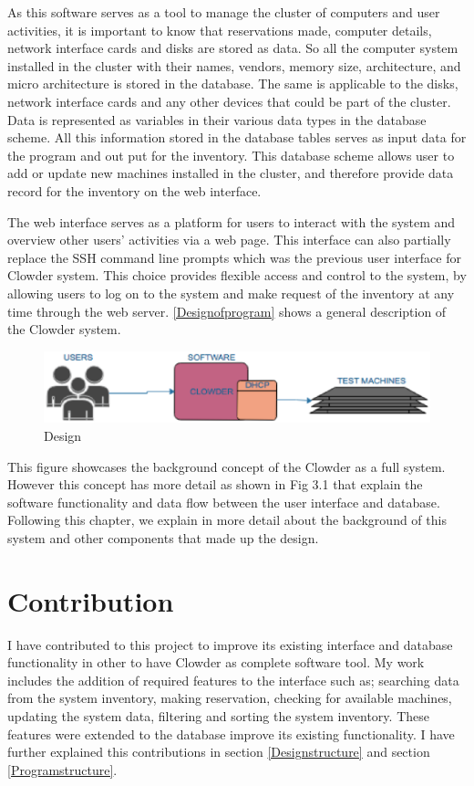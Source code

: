 As this software serves as a tool to manage the cluster of computers and user activities, it is important to know that  reservations made, computer details, network interface cards and disks are stored as data. So all the computer system installed in the cluster with their names, vendors, memory size, architecture, and micro architecture is stored in the database. The same is applicable to the disks, network interface cards and any other devices that could be part of the cluster. Data is represented as variables in their various data types in the database scheme.  All this information stored in the database tables serves as input  data for the program and out put for the inventory. This database scheme allows user to add or update new machines installed in the cluster, and therefore provide data record for the inventory on the web interface. 

The web interface serves as a platform for users to interact with the system and overview other users' activities via a web page. This interface can also  partially replace the SSH command line prompts which was the previous user interface for Clowder system. This choice provides flexible access and control to the system, by allowing users to log on to the system and make request of the inventory at any time through the web server.
\autoref{Designofprogram} shows a general description of the Clowder system.

\begin{figure}[h]
  \includegraphics[width=\linewidth]{background.eps}
  \caption{Design}
  \label{Designofprogram}
\end{figure}
\pagebreak

This figure showcases the background concept of the Clowder as a full system. However this concept has more detail as shown in Fig 3.1 that explain the software functionality and data flow between the user interface and database. Following this chapter, we explain in more detail about the background of this system and other components that made up the design.

\section{Contribution}
I have contributed to this project to improve its existing interface and database functionality in other to have Clowder as complete software tool. My work includes the addition of required features to the interface such as; searching data from the system inventory, making reservation, checking for available machines, updating the system data, filtering and sorting the system inventory. These features were extended to the database improve its existing functionality. I have further explained this contributions in section \ref{Designstructure} and section \ref{Programstructure}.
